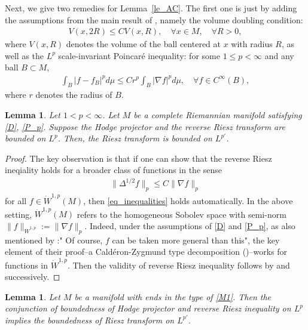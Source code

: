 \documentclass[12pt]{amsart}
\newtheorem{lemma}[theorem]{Lemma}
\begin{document}
Next, we give two remedies for Lemma~\ref{le_AC}. The first one is just by adding the assumptions from the main result of \cite[Theorem~2.1]{AC}, namely the volume doubling condition:
\begin{align}\label{D}
    V(x,2R) \le C V(x,R), \quad \forall x\in M, \quad \forall R>0,
\end{align}
where $V(x,R)$ denotes the volume of the ball centered at $x$ with radius $R$, as well as the $L^p$ scale-invariant Poincaré inequality: for some $1\le p < \infty$ and any ball $B\subset M$,
\begin{align}\label{P_p}
    \int_B |f-f_B|^p d\mu \le C r^p \int_B |\nabla f|^p d\mu,\quad \forall f\in C^\infty(B),
\end{align}
where $r$ denotes the radius of $B$.

\begin{lemma}\label{le_remedy1}
Let $1<p<\infty$. Let $M$ be a complete Riemannian manifold satisfying \eqref{D}, \eqref{P_p}. Suppose the Hodge projector and the reverse Riesz transform are bounded on $L^p$. Then, the Riesz transform is bounded on $L^{p'}$. 
\end{lemma}

\begin{proof}
The key observation is that if one can show that the reverse Riesz ineqiality holds for a broader class of functions in the sense
\begin{align*}
    \|\Delta^{1/2}f\|_p \le C \|\nabla f\|_p
\end{align*}
for all $f\in \dot{W}^{1,p}(M)$, then \eqref{eq_inequalities} holds automatically. In the above setting, $\dot{W}^{1,p}(M)$ refers to the homogeneous Sobolev space with semi-norm $\|f\|_{\dot{W}^{1,p}}:=\|\nabla f\|_p$. Indeed, under the assumptions of \eqref{D} and \eqref{P_p}, as also mentioned by \cite[footnote at page~6]{AC}:" Of course, $f$ can be taken more general than this", the key element of their proof--a Caldéron-Zygmund type decomposition  (\cite[Proposition~1.1]{AC})--works for functions in $\dot{W}^{1,p}$. Then the validity of reverse Riesz inequality follows by \cite[Section~1.2]{AC} and \cite[Section~1.3]{AC} successively.
\end{proof}


\begin{lemma}\label{le_remedy2}
Let $M$ be a manifold with ends in the type of \eqref{M1}. Then the conjunction of boundedness of Hodge projector and reverse Riesz inequality on $L^p$ implies the boundedness of Riesz transform on $L^{p'}$.  
\end{lemma}
\end{document}
